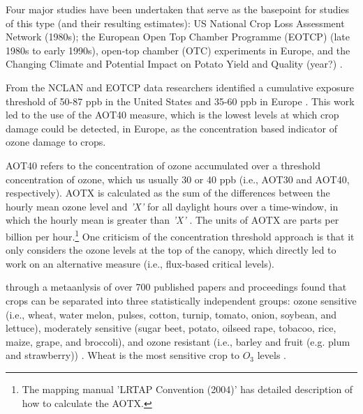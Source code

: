 \documentclass[10pt]{amsart}
\begin{document}
Four major studies have been undertaken that serve as the basepoint for studies of this type (and their resulting estimates): US National Crop Loss Assessment Network (1980s); the European Open Top Chamber Programme (EOTCP) (late 1980s to early 1990s), open-top chamber (OTC) experiments in Europe, and the Changing Climate and Potential Impact on Potato Yield and Quality (year?) \parencite{mills:2007aa}. 

From the NCLAN and EOTCP data researchers identified a cumulative exposure threshold of 50-87 ppb in the United States and 35-60 ppb in Europe \parencite{mills:2007aa}.
This work led to the use of the AOT40 measure, which is the lowest levels at which crop damage could be detected, in Europe, as the concentration based indicator of ozone damage to crops.

AOT40 refers to the concentration of ozone accumulated over a threshold concentration of ozone, which us usually 30 or 40 ppb (i.e., AOT30 and AOT40, respectively). 
AOTX is calculated as the sum of the differences between the hourly mean ozone level and \textit{'X'} for all daylight hours over a time-window, in which the hourly mean is greater than \textit{'X'} \parencite{mills:2007aa}.
The units of AOTX are parts per billion per hour.\footnote{The mapping manual 'LRTAP Convention (2004)' has detailed description of how to calculate the AOTX.}
One criticism of the concentration threshold approach is that it only considers the ozone levels at the top of the canopy, which directly led to work on an alternative measure (i.e., flux-based critical levels). 

\cite{mills:2007aa} through a metaanlysis of over 700 published papers and proceedings found that crops can be separated into three statistically independent groups: ozone sensitive (i.e., wheat, water melon, pulses, cotton, turnip, tomato, onion, soybean, and lettuce), moderately sensitive (sugar beet, potato, oilseed rape, tobacoo, rice, maize, grape, and broccoli), and ozone resistant (i.e., barley and fruit (e.g. plum and strawberry)) \parencite{mills:2007aa}.  
Wheat is the most sensitive crop to $O_{3}$ levels \parencite{mills:2007aa}. 
\end{document}
